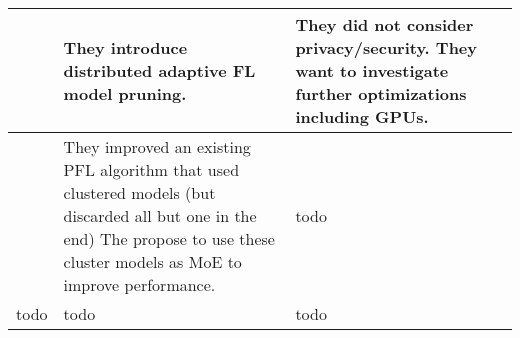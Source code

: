 \begin{changemargin}{-2cm}{0cm}
\begin{tabular}{|c||m{0.4\paperwidth}|m{0.4\paperwidth}|}
            &
            They introduce distributed adaptive FL model pruning.
            &
            They did not consider privacy/security.
            They want to investigate further optimizations including GPUs.
        \\
        \hline
            \cite{paper:adaptive_exper_models_for_pfl}
            &
            They improved an existing PFL algorithm that used clustered models (but discarded all but one in the end)
            The propose to use these cluster models as MoE to improve performance.
            &
            todo
        \\
        \hline
            todo
            &
            todo
            &
            todo
        \\
        \hline
    \end{tabular}
\end{changemargin}











